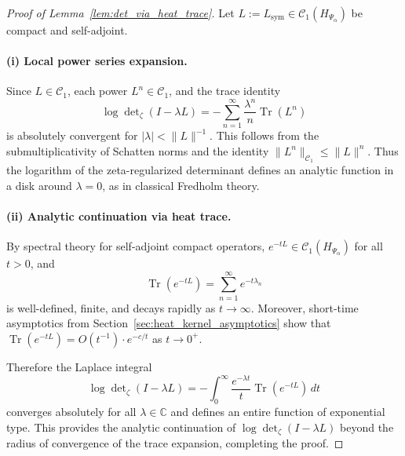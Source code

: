 \begin{proof}[Proof of Lemma~\ref{lem:det_via_heat_trace}]
Let \( L := L_{\mathrm{sym}} \in \mathcal{C}_1(H_{\Psi_\alpha}) \) be compact and self-adjoint.

\paragraph{(i) Local power series expansion.}
Since \( L \in \mathcal{C}_1 \), each power \( L^n \in \mathcal{C}_1 \), and the trace identity
\[
\log \det\nolimits_\zeta(I - \lambda L) = - \sum_{n=1}^\infty \frac{\lambda^n}{n} \operatorname{Tr}(L^n)
\]
is absolutely convergent for \( |\lambda| < \|L\|^{-1} \). This follows from the submultiplicativity of Schatten norms and the identity \( \|L^n\|_{\mathcal{C}_1} \le \|L\|^n \). Thus the logarithm of the zeta-regularized determinant defines an analytic function in a disk around \( \lambda = 0 \), as in classical Fredholm theory.

\paragraph{(ii) Analytic continuation via heat trace.}
By spectral theory for self-adjoint compact operators, \( e^{-tL} \in \mathcal{C}_1(H_{\Psi_\alpha}) \) for all \( t > 0 \), and
\[
\operatorname{Tr}(e^{-tL}) = \sum_{n=1}^\infty e^{-t\lambda_n}
\]
is well-defined, finite, and decays rapidly as \( t \to \infty \). Moreover, short-time asymptotics from Section~\ref{sec:heat_kernel_asymptotics} show that \( \operatorname{Tr}(e^{-tL}) = O(t^{-1}) \cdot e^{-c/t} \) as \( t \to 0^+ \).

\medskip
\noindent
Therefore the Laplace integral
\[
\log \det\nolimits_\zeta(I - \lambda L)
= - \int_0^\infty \frac{e^{-\lambda t}}{t} \operatorname{Tr}(e^{-tL})\, dt
\]
converges absolutely for all \( \lambda \in \mathbb{C} \) and defines an entire function of exponential type. This provides the analytic continuation of \( \log \det_\zeta(I - \lambda L) \) beyond the radius of convergence of the trace expansion, completing the proof.
\end{proof}
%  